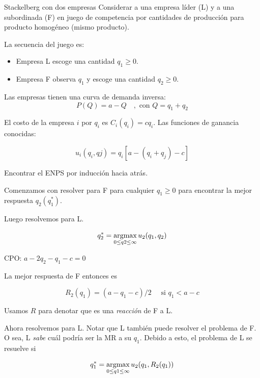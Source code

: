 \documentclass[12pt]{scrartcl}
\begin{document}
\begin{exbox}{Stackelberg con dos empresas}
	Considerar a una empresa líder (L) y a una subordinada (F) en juego de competencia por cantidades de producción para producto homogéneo (mismo producto). 
	    
	La secuencia del juego es: 
	    
	\begin{itemize}
		\item Empresa L escoge una cantidad $q_1 \geq 0$.
		\item Empresa F observa $q_1$ y escoge una cantidad $q_2\geq 0$.
	\end{itemize}
	    
	Las empresas tienen una curva de demanda inversa:
	\[ P(Q) = a - Q\quad, \text{ con } Q = q_1 + q_2 \]
	    
	    
	El costo de la empresa $i$ por $q_i$ es $C_i(q_i)=cq_i$. Las funciones de ganancia conocidas:
	    
	\[u_i(q_i, qj)=q_i[a - (q_i + q_j) -c] \]
	    
	Encontrar el ENPS por inducción hacia atrás. 
	    
	\begin{myenum}
		\item Comenzamos con resolver para F para cualquier $q_1 \geq 0$ para encontrar la mejor respuesta $q_2(q_1^*)$. 
		\item Luego resolvemos para L.
	\end{myenum}
	    
	\[q_2^* = \operatorname*{argmax}_{0\leq q2 \leq \infty} u_2(q_1, q_2) \]
	    
	CPO: $a - 2q_2 - q_1 - c = 0$
	    
	La mejor respuesta de F entonces es
	    
	\[ R_2(q_1) = (a - q_1 - c)/2\quad \text{ si } q_1 <a-c \]
	    
	Usamos $R$ para denotar que es una \textit{reacción} de F a L.
	    
	Ahora resolvemos para L. Notar que L también puede resolver el problema de F. O sea, L \textit{sabe} cuál podría ser la MR a su $q_1$. Debido a esto, el problema de L se resuelve si
	    
	\[q_1^* = \operatorname*{argmax}_{0\leq q1 \leq \infty} u_2(q_1, R_2(q_1)) \]
	    

\end{exbox}
\end{document}
